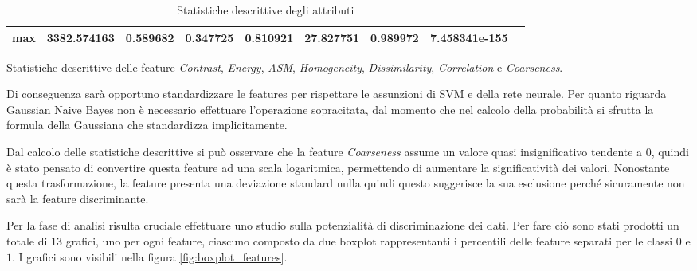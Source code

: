 \begin{table}[h!]
\begin{subtable}[h]{1\textwidth}
{\begin{tabular}{c|c c c c c c c c}
                        \textbf{max}                                              & 3382.574163       & 0.589682        & 0.347725     & 0.810921             & 27.827751              & 0.989972             & 7.458341e-155       \\ \hline
                  \end{tabular}}
            \caption{Statistiche descrittive delle feature \textit{Contrast}, \textit{Energy}, \textit{ASM}, \textit{Homogeneity}, \textit{Dissimilarity}, \textit{Correlation} e \textit{Coarseness}.}
            \label{tab:secondameta}
      \end{subtable}
      \caption{Statistiche descrittive degli attributi}
      \label{tab:desc-stat}
\end{table}

Di conseguenza sarà opportuno standardizzare le features per rispettare le 
assunzioni di SVM e della rete neurale. Per quanto riguarda Gaussian Naive
Bayes non è necessario effettuare l'operazione sopracitata, dal momento che nel calcolo della 
probabilità si sfrutta la formula della Gaussiana che standardizza implicitamente.

Dal calcolo delle statistiche descrittive si può osservare che la feature \textit{Coarseness}
assume un valore quasi insignificativo tendente a $0$, quindi è stato pensato di convertire questa feature
ad una scala logaritmica, permettendo di aumentare la significatività dei valori.
Nonostante questa trasformazione, la feature presenta una deviazione standard nulla 
quindi questo suggerisce la sua esclusione perché sicuramente non sarà la
feature discriminante.

Per la fase di analisi risulta cruciale effettuare uno studio sulla potenzialità 
di discriminazione dei dati. Per fare ciò sono stati prodotti un totale di $13$
grafici, uno per ogni feature, ciascuno composto da due boxplot rappresentanti
i percentili delle feature separati per le classi $0$ e $1$. I grafici sono visibili
nella figura \ref{fig:boxplot_features}.

\newpage

